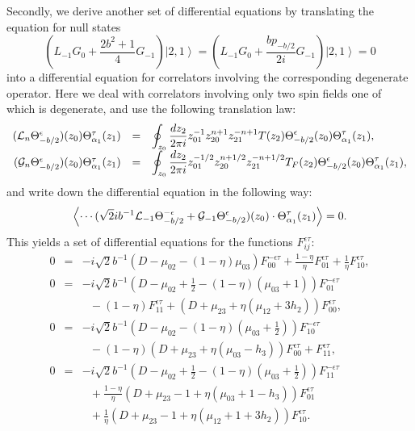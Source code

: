 \documentclass[a4paper,12pt]{article}
\newcommand{\vev}[1]{\left<{#1}\right>}
\newcommand{\ket}[1]{\left|{#1}\right>}
\newcommand{\mfrac}[2]{{\displaystyle\frac{#1}{#2}}}
\newcommand{\ep}{{\epsilon}}
\begin{document}
   Secondly, we derive another set of differential equations
 by translating the equation for null states
\begin{equation}
  (L_{-1}G_0+\frac{2b^2+1}{4}G_{-1})\ket{2,1}
 =(L_{-1}G_0+\frac{bp_{-b/2}}{2i}G_{-1})\ket{2,1}
 =0
\label{ns}
\end{equation}
 into a differential equation for correlators involving
 the corresponding degenerate operator.
 Here we deal with correlators
 involving only two spin fields one of which is degenerate,
 and use the following translation law:
\begin{equation}
\begin{array}{rcl}
  ({\cal L}_n\Theta_{-b/2}^{\ep})(z_0)\Theta_{\alpha_1}^{\tau}(z_1)
  &=& \displaystyle\oint_{z_0}\frac{dz_2}{2\pi i}
       z_{01}^{-1}z_{20}^{n+1}z_{21}^{-n+1}T(z_2)
     \Theta_{-b/2}^{\ep}(z_0)\Theta_{\alpha_1}^{\tau}(z_1), \\
  ({\cal G}_n\Theta_{-b/2}^{\ep})(z_0)\Theta_{\alpha_1}^{\tau}(z_1)
  &=& \displaystyle\oint_{z_0}\frac{dz_2}{2\pi i}
       z_{01}^{-1/2}z_{20}^{n+1/2}z_{21}^{-n+1/2}T_F(z_2)
     \Theta_{-b/2}^{\ep}(z_0)\Theta_{\alpha_1}^{\tau}(z_1),
\end{array}
\end{equation}
 and write down the differential equation in the following way:
\begin{equation}
 \vev{\cdots (\sqrt{2}ib^{-1}{\cal L}_{-1}\Theta_{-b/2}^{-\ep}
             +{\cal G}_{-1}\Theta_{-b/2}^{\ep})
      (z_0)\cdot\Theta_{\alpha_1}^{\tau}(z_1)}=0.
\end{equation}
 This yields a set of differential equations for the functions
 $F_{ij}^{\ep\tau}$:
\begin{eqnarray}
 0 &=&
 -i\sqrt{2}b^{-1}(D-\mu_{02}-(1-\eta)\mu_{03})F_{00}^{-\ep\tau}
  + \mfrac{1-\eta}{\eta}F_{01}^{\ep\tau}+\mfrac{1}{\eta}F_{10}^{\ep\tau},
 \nonumber \\
 0 &=&
 -i\sqrt{2}b^{-1}(D-\mu_{02}+\frac{1}{2}-(1-\eta)(\mu_{03}+1))F_{01}^{-\ep\tau}
 \nonumber \\&&~~~
 -(1-\eta)F_{11}^{\ep\tau}
 +(D+\mu_{23}+\eta(\mu_{12}+3h_2))F_{00}^{\ep\tau},
 \nonumber  \\
 0 &=&
 -i\sqrt{2}b^{-1}(D-\mu_{02}-(1-\eta)(\mu_{03}+\frac{1}{2}))F_{10}^{-\ep\tau}
\label{nsD} \\&&~~~
 -(1-\eta)(D+\mu_{23}+\eta(\mu_{03}-h_3))F_{00}^{\ep\tau}+F_{11}^{\ep\tau},
 \nonumber \\
 0 &=&
 -i\sqrt{2}b^{-1}(D-\mu_{02}+\frac{1}{2}-(1-\eta)(\mu_{03}+\frac{1}{2}))
          F_{11}^{-\ep\tau}
 \nonumber \\&&~~~
 +\frac{1-\eta}{\eta}(D+\mu_{23}-1+\eta(\mu_{03}+1-h_3))F_{01}^{\ep\tau}
 \nonumber \\&&~~~
 +\frac{1}{\eta}(D+\mu_{23}-1+\eta(\mu_{12}+1+3h_2))F_{10}^{\ep\tau}.
 \nonumber
\end{eqnarray}
\end{document}

